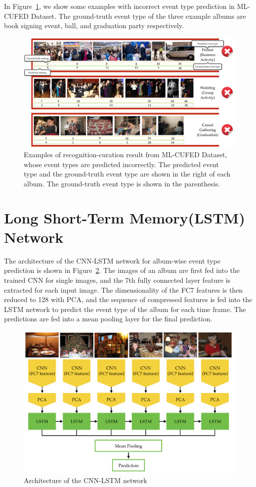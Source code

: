 \documentclass[runningheads]{llncs}
\begin{document}
In Figure~\ref{wrong1}, we show some examples with incorrect event type prediction in ML-CUFED Dataset. The ground-truth event type of the three example albums are book signing event, ball, and graduation party respectively.
\begin{figure}
\vspace{-0.1in}
\centering
\includegraphics[width=5in]{wrong1}
\caption{Examples of recognition-curation result from ML-CUFED Dataset, whose event types are predicted incorrectly. The predicted event type and the ground-truth event type are shown in the right of each album. The ground-truth event type is shown in the parenthesis.}
\label{wrong1}
\vspace{-0.2in}
\end{figure}

\section{Long Short-Term Memory(LSTM) Network}
The architecture of the CNN-LSTM network for album-wise event type prediction is shown in Figure~\ref{LSTM}. The images of an album are first fed into the trained CNN for single images, and the 7th fully connected layer feature is extracted for each input image. The dimensionality of the FC7 features is then reduced to 128 with PCA, and the sequence of compressed features is fed into the LSTM network to predict the event type of the album for each time frame. The predictions are fed into a mean pooling layer for the final prediction.
\begin{figure}
\vspace{-0.1in}
\centering
\includegraphics[width=4.5in]{LSTM}
\caption{Architecture of the CNN-LSTM network}
\label{LSTM}
\vspace{-0.2in}
\end{figure}


%
\end{document}
